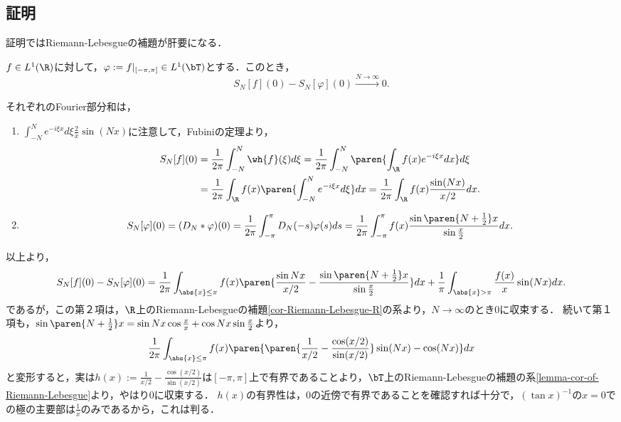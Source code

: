 \documentclass[uplatex,dvipdfmx]{jsreport}
\begin{document}
\subsection{証明}

\begin{tcolorbox}[colframe=ForestGreen, colback=ForestGreen!10!white,breakable,colbacktitle=ForestGreen!40!white,coltitle=black,fonttitle=\bfseries\sffamily,
title=]
    証明ではRiemann-Lebesgueの補題が肝要になる．
\end{tcolorbox}

\begin{lemma}[Fourier部分和の差の収束１]
    $f\in L^1(\R)$に対して，$\varphi:=f|_{[-\pi,\pi]}\in L^1(\bT)$とする．このとき，
    \[S_N[f](0)-S_N[\varphi](0)\xrightarrow{N\to\infty}0.\]
\end{lemma}
\begin{Proof}
    それぞれのFourier部分和は，
    \begin{enumerate}
        \item $\int^N_{-N}e^{-i\xi x}d\xi\frac{2}{x}\sin(Nx)$に注意して，Fubiniの定理より，
        \begin{align*}
            S_N[f](0)&=\frac{1}{2\pi}\int^N_{-N}\wh{f}(\xi)d\xi=\frac{1}{2\pi}\int^N_{-N}\paren{\int_\R f(x)e^{-i\xi x}dx}d\xi\\
            &=\frac{1}{2\pi}\int_\R f(x)\paren{\int^N_{-N}e^{-i\xi x}d\xi}dx=\frac{1}{2\pi}\int_\R f(x)\frac{\sin(Nx)}{x/2}dx.
        \end{align*}
        \item \[S_N[\varphi](0)=(D_N*\varphi)(0)=\frac{1}{2\pi}\int^\pi_{-\pi}D_N(-s)\varphi(s)ds=\frac{1}{2\pi}\int^\pi_{-\pi}f(x)\frac{\sin\paren{N+\frac{1}{2}}x}{\sin\frac{x}{2}}dx.\]
    \end{enumerate}
    以上より，
    \[S_N[f](0)-S_N[\varphi](0)=\frac{1}{2\pi}\int_{\abs{x}\le\pi}f(x)\paren{\frac{\sin Nx}{x/2}-\frac{\sin\paren{N+\frac{1}{2}}x}{\sin\frac{x}{2}}}dx+\frac{1}{\pi}\int_{\abs{x}>\pi}\frac{f(x)}{x}\sin (Nx)dx.\]
    であるが，この第２項は，$\R$上のRiemann-Lebesgueの補題\ref{cor-Riemann-Lebesgue-R}の系より，$N\to\infty$のとき$0$に収束する．
    続いて第１項も，$\sin\paren{N+\frac{1}{2}}x=\sin Nx\cos\frac{x}{x}+\cos Nx\sin\frac{x}{2}$より，
    \[\frac{1}{2\pi}\int_{\abs{x}\le\pi}f(x)\paren{\paren{\frac{1}{x/2}-\frac{\cos(x/2)}{\sin(x/2)}}\sin(Nx)-\cos (Nx)}dx\]
    と変形すると，実は$h(x):=\frac{1}{x/2}-\frac{\cos(x/2)}{\sin(x/2)}$は$[-\pi,\pi]$上で有界であることより，$\bT$上のRiemann-Lebesgueの補題の系\ref{lemma-cor-of-Riemann-Lebesgue}より，やはり$0$に収束する．
    $h(x)$の有界性は，$0$の近傍で有界であることを確認すれば十分で，$(\tan x)^{-1}$の$x=0$での極の主要部は$\frac{1}{x}$のみであるから，これは判る．
\end{Proof}
\end{document}
